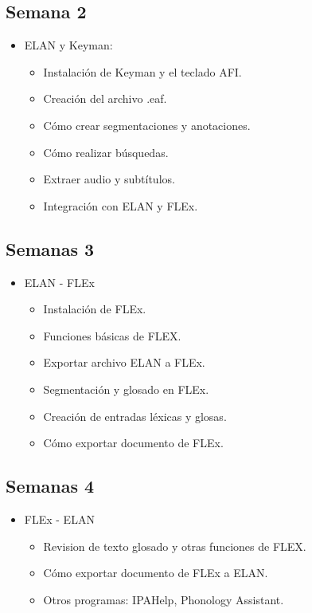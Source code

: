 \documentclass[12pt]{article}
\begin{document}
\subsection*{Semana 2}
\begin{itemize}
\item ELAN y Keyman:
\begin{itemize}
\item Instalación de Keyman y el teclado AFI.
\item Creación del archivo .eaf.
\item Cómo crear segmentaciones y anotaciones.
\item Cómo realizar búsquedas.
\item Extraer audio y subtítulos.
\item Integración con ELAN y FLEx.
\end{itemize}
\end{itemize}

\subsection*{Semanas 3}
\begin{itemize}
\item ELAN - FLEx
\begin{itemize}
\item Instalación de FLEx. 
\item Funciones básicas de FLEX. 
\item Exportar archivo ELAN a FLEx.
\item Segmentación y glosado en FLEx. 
\item Creación de entradas léxicas y glosas.
\item Cómo exportar documento de FLEx.
\end{itemize}
\end{itemize}
\subsection*{Semanas 4}
 
\begin{itemize}
\item FLEx - ELAN
\begin{itemize}
\item Revision de texto glosado y otras funciones de FLEX.
\item Cómo exportar documento de FLEx a ELAN.
\item Otros programas: IPAHelp, Phonology Assistant.
\end{itemize}
\end{itemize}
\end{document}
